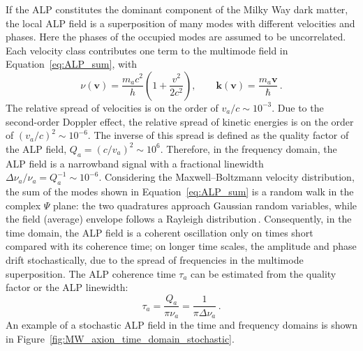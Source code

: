If the ALP constitutes the dominant component of the Milky Way dark matter, the local ALP field is a superposition of many modes with different velocities and phases.
Here the phases of the occupied modes are assumed to be uncorrelated.
Each velocity class contributes one term to the multimode field in Equation~\eqref{eq:ALP_sum}, with
\begin{equation}
    \nu(\boldsymbol{v})
    =\frac{m_a c^2}{h} \left(1 + \frac{v^2}{2c^2}\right),
    \qquad
    \boldsymbol{k}(\boldsymbol{v})=\frac{m_a\boldsymbol{v}}{\hbar}
    \,.
\end{equation}
The relative spread of velocities is on the order of $v_a/c \sim 10^{-3}$.
Due to the second-order Doppler effect, the relative spread of kinetic energies is on the order of $(v_a/c)^2 \sim 10^{-6}$.
The inverse of this spread is defined as the quality factor of the ALP field, $Q_a =(c/v_a)^2 \sim 10^6$.
Therefore, in the frequency domain, the ALP field is a narrowband signal with a fractional linewidth $\Delta\nu_a/\nu_a = Q_a^{-1} \sim 10^{-6}$.
Considering the Maxwell--Boltzmann velocity distribution, the sum of the modes shown in Equation~\eqref{eq:ALP_sum} is a random walk in the complex $\Psi$ plane: the two quadratures approach Gaussian random variables, while the field (average) envelope follows a Rayleigh distribution\,\cite{Centers2021Stochastic,Gramolin2022Feb_SpectralSignatures}.
Consequently, in the time domain, the ALP field is a coherent oscillation only on times short compared with its coherence time; on longer time scales, the amplitude and phase drift stochastically, due to the spread of frequencies in the multimode superposition.
The ALP coherence time $\tau_a$ can be estimated from the quality factor or the ALP linewidth:
\begin{equation}
    \tau_a = \frac{Q_a}{\pi \nu_a} = \frac{1}{\pi \Delta\nu_a}
    \,.
    \label{eq:taua_Qa_nua}
\end{equation}
An example of a stochastic ALP field in the time and frequency domains is shown in Figure~\ref{fig:MW_axion_time_domain_stochastic}.

